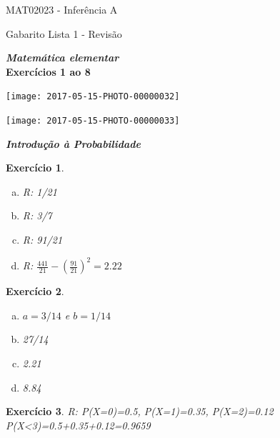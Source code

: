 \documentclass[letter,11pt]{article}
\newtheorem{exer}{Exercício}
\begin{document}
\begin{center}{ \Large MAT02023 - Inferência A }\end{center}

\begin{center}
{\large  \sc Gabarito Lista 1 - Revisão}
\end{center}
\vspace{15mm}


\noindent \textit{\textbf{Matemática elementar}} \\
\noindent \textbf{Exercícios 1 ao 8}

\texttt{[image: 2017-05-15-PHOTO-00000032]}

\texttt{[image: 2017-05-15-PHOTO-00000033]}


\newpage
\bigskip
\noindent \textit{\textbf{Introdução à Probabilidade}}

\medskip
\setcounter{exer}{8}
\medskip
\begin{exer} \rm %

\begin{enumerate}[a)]
\item R: 1/21
\item  R: 3/7
\item  R: 91/21 
\item  R:  $\frac{441}{21}-\left(\frac{91}{21}\right)^2=2.22$
\end{enumerate}
\end{exer}





\medskip
\begin{exer} \rm
\begin{enumerate}[a)]

\item  $a=3/14$ e $b=1/14$ 
\item 27/14

\item 2.21

\item  8.84

\end{enumerate}
\end{exer}






\medskip
\begin{exer} \rm %
R: P(X=0)=0.5, P(X=1)=0.35, P(X=2)=0.12 P(X<3)=0.5+0.35+0.12=0.9659
\end{exer}
\end{document}

